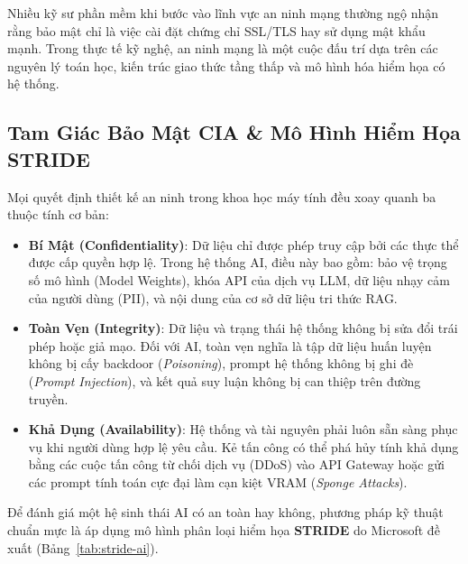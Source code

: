 Nhiều kỹ sư phần mềm khi bước vào lĩnh vực an ninh mạng thường ngộ nhận rằng bảo mật chỉ là việc cài đặt chứng chỉ SSL/TLS hay sử dụng mật khẩu mạnh. Trong thực tế kỹ nghệ, an ninh mạng là một cuộc đấu trí dựa trên các nguyên lý toán học, kiến trúc giao thức tầng thấp và mô hình hóa hiểm họa có hệ thống.

\subsection{Tam Giác Bảo Mật CIA \& Mô Hình Hiểm Họa STRIDE}
\begin{definition}
Mọi quyết định thiết kế an ninh trong khoa học máy tính đều xoay quanh ba thuộc tính cơ bản:
\begin{itemize}
  \item \textbf{Bí Mật (Confidentiality)}: Dữ liệu chỉ được phép truy cập bởi các thực thể được cấp quyền hợp lệ. Trong hệ thống AI, điều này bao gồm: bảo vệ trọng số mô hình (Model Weights), khóa API của dịch vụ LLM, dữ liệu nhạy cảm của người dùng (PII), và nội dung của cơ sở dữ liệu tri thức RAG.
  \item \textbf{Toàn Vẹn (Integrity)}: Dữ liệu và trạng thái hệ thống không bị sửa đổi trái phép hoặc giả mạo. Đối với AI, toàn vẹn nghĩa là tập dữ liệu huấn luyện không bị cấy backdoor (\textit{Poisoning}), prompt hệ thống không bị ghi đè (\textit{Prompt Injection}), và kết quả suy luận không bị can thiệp trên đường truyền.
  \item \textbf{Khả Dụng (Availability)}: Hệ thống và tài nguyên phải luôn sẵn sàng phục vụ khi người dùng hợp lệ yêu cầu. Kẻ tấn công có thể phá hủy tính khả dụng bằng các cuộc tấn công từ chối dịch vụ (DDoS) vào API Gateway hoặc gửi các prompt tính toán cực đại làm cạn kiệt VRAM (\textit{Sponge Attacks}).
\end{itemize}
\end{definition}

Để đánh giá một hệ sinh thái AI có an toàn hay không, phương pháp kỹ thuật chuẩn mực là áp dụng mô hình phân loại hiểm họa \textbf{STRIDE} do Microsoft đề xuất (Bảng~\ref{tab:stride-ai}).

